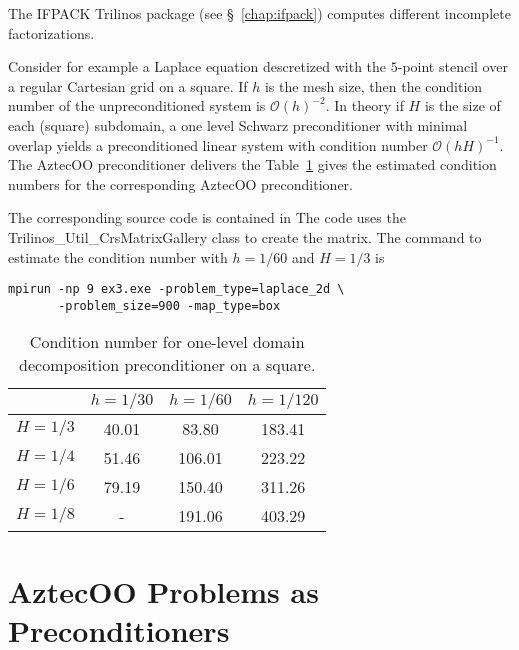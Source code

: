 \begin{remark} The IFPACK Trilinos package (see \S~\ref{chap:ifpack})
computes different incomplete factorizations. 
\end{remark}

Consider for example a Laplace equation descretized with the $5$-point stencil 
over a regular Cartesian grid on a square.
If $h$ is the mesh size, then the condition number of the unpreconditioned system
is $\mathcal{O}(h)^{-2}$.
In theory \cite{smbg:96} if $H$ is the size of each (square) subdomain,
a one level Schwarz preconditioner with minimal overlap
yields a preconditioned linear system with condition number
$\mathcal{O}(hH)^{-1}$.
The AztecOO preconditioner delivers the 
Table~\ref{tab:aztecoo:dd} gives the estimated condition
numbers for the corresponding AztecOO preconditioner.

The corresponding source code is contained in
\newline
{} 
\newline
The code uses the Trilinos\_Util\_CrsMatrixGallery class to
create the matrix. The command to estimate the condition number with
$h=1/60$ and $H=1/3$ is 
\begin{verbatim}
mpirun -np 9 ex3.exe -problem_type=laplace_2d \
       -problem_size=900 -map_type=box
\end{verbatim}

\begin{table}[htbp]
  \centering
  \begin{tabular}{| c | c c c |}
    \hline
    & $h=1/30$ & $h=1/60$ & $h=1/120$ \\
    \hline
    $H=1/3$ & 40.01 & 83.80 & 183.41 \\
    $H=1/4$ & 51.46 & 106.01 & 223.22 \\
    $H=1/6$ & 79.19 & 150.40 & 311.26 \\
    $H=1/8$ & -     & 191.06 & 403.29 \\
    \hline
  \end{tabular}
  \caption{Condition number for one-level domain decomposition preconditioner on a square.}
  \label{tab:aztecoo:dd}
\end{table}


\section{AztecOO Problems as Preconditioners}
\label{sec:prec_aztecoo}

